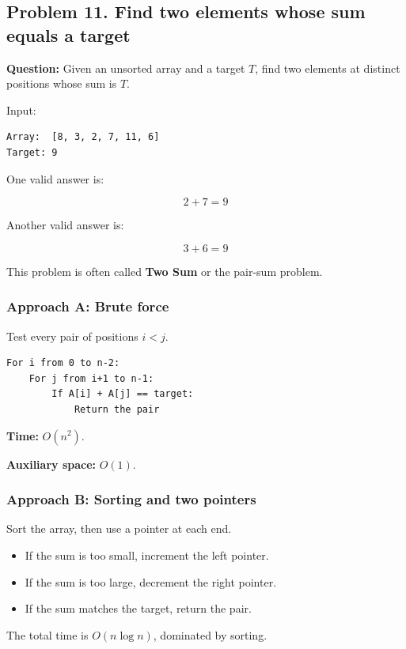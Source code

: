 \subsection{Problem 11. Find two elements whose sum equals a target}

\textbf{Question:} Given an unsorted array and a target $T$, find two elements at distinct positions whose sum is $T$.

Input:

\begin{lstlisting}[style=pseudocode]
Array:  [8, 3, 2, 7, 11, 6]
Target: 9
\end{lstlisting}

One valid answer is:


\[
2+7=9
\]


Another valid answer is:


\[
3+6=9
\]


This problem is often called \textbf{Two Sum} or the pair-sum problem.

\subsubsection{Approach A: Brute force}

Test every pair of positions $i<j$.

\begin{lstlisting}[style=pseudocode]
For i from 0 to n-2:
    For j from i+1 to n-1:
        If A[i] + A[j] == target:
            Return the pair
\end{lstlisting}

\textbf{Time:} $O(n^2)$.

\textbf{Auxiliary space:} $O(1)$.

\subsubsection{Approach B: Sorting and two pointers}

Sort the array, then use a pointer at each end.

\begin{itemize}
    \item If the sum is too small, increment the left pointer.
    \item If the sum is too large, decrement the right pointer.
    \item If the sum matches the target, return the pair.
\end{itemize}

The total time is $O(n\log n)$, dominated by sorting.

